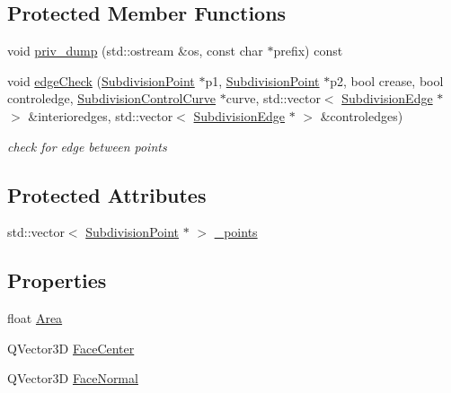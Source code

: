 \subsection*{Protected Member Functions}
\begin{DoxyCompactItemize}
\item 
void \hyperlink{classShipCAD_1_1SubdivisionFace_ab2f647963b552728f40d8c329318676e}{priv\-\_\-dump} (std\-::ostream \&os, const char $\ast$prefix) const 
\item 
void \hyperlink{classShipCAD_1_1SubdivisionFace_a5399f7ec8ed458f6dbc733688c006cf8}{edge\-Check} (\hyperlink{classShipCAD_1_1SubdivisionPoint}{Subdivision\-Point} $\ast$p1, \hyperlink{classShipCAD_1_1SubdivisionPoint}{Subdivision\-Point} $\ast$p2, bool crease, bool controledge, \hyperlink{classShipCAD_1_1SubdivisionControlCurve}{Subdivision\-Control\-Curve} $\ast$curve, std\-::vector$<$ \hyperlink{classShipCAD_1_1SubdivisionEdge}{Subdivision\-Edge} $\ast$ $>$ \&interioredges, std\-::vector$<$ \hyperlink{classShipCAD_1_1SubdivisionEdge}{Subdivision\-Edge} $\ast$ $>$ \&controledges)
\begin{DoxyCompactList}\small\item\em check for edge between points \end{DoxyCompactList}\end{DoxyCompactItemize}
\subsection*{Protected Attributes}
\begin{DoxyCompactItemize}
\item 
std\-::vector$<$ \hyperlink{classShipCAD_1_1SubdivisionPoint}{Subdivision\-Point} $\ast$ $>$ \hyperlink{classShipCAD_1_1SubdivisionFace_ae1178fe10860c57e3e54a397b4dc7b4b}{\-\_\-points}
\end{DoxyCompactItemize}
\subsection*{Properties}
\begin{DoxyCompactItemize}
\item 
float \hyperlink{classShipCAD_1_1SubdivisionFace_a88e0042b53b3830a523dfb782f3af6d5}{Area}
\item 
Q\-Vector3\-D \hyperlink{classShipCAD_1_1SubdivisionFace_a8daac1b66fdaee14e3f8fb443106162e}{Face\-Center}
\item 
Q\-Vector3\-D \hyperlink{classShipCAD_1_1SubdivisionFace_a44c07f86c9225ad2c463b259288fca94}{Face\-Normal}
\end{DoxyCompactItemize}


